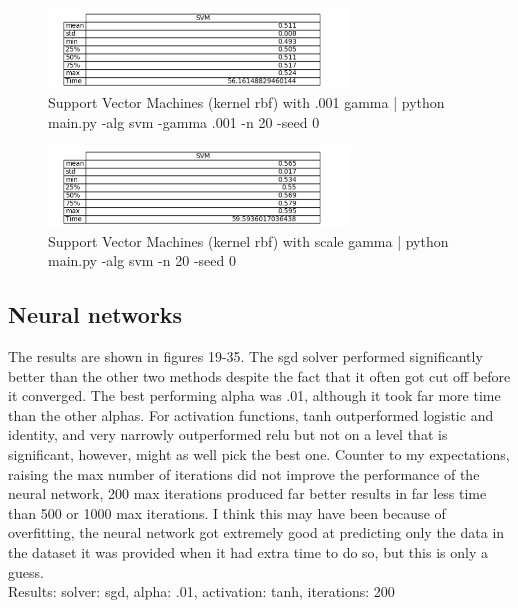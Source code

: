 \documentclass{article}
\begin{document}
\begin{figure}
\begin{center}
\includegraphics[width=8cm]{images/svm_001}
\caption{Support Vector Machines (kernel rbf) with .001 gamma | python main.py -alg svm -gamma .001 -n 20 -seed 0}
\end{center}
\end{figure}
\begin{figure}
\begin{center}
\includegraphics[width=8cm]{images/svm_scale}
\caption{Support Vector Machines (kernel rbf) with scale gamma | python main.py -alg svm -n 20 -seed 0}
\end{center}
\end{figure}

\subsection{Neural networks}

The results are shown in figures 19-35. The sgd solver performed significantly better than the other two methods despite the fact that it often got cut off before it converged. The best performing alpha was .01, although it took far more time than the other alphas. For activation functions, tanh outperformed logistic and identity, and very narrowly outperformed relu but not on a level that is significant, however, might as well pick the best one. Counter to my expectations, raising the max number of iterations did not improve the performance of the neural network, 200 max iterations produced far better results in far less time than 500 or 1000 max iterations. I think this may have been because of overfitting, the neural network got extremely good at predicting only the data in the dataset it was provided when it had extra time to do so, but this is only a guess.\\

Results: solver: sgd, alpha: .01, activation: tanh, iterations: 200
\end{document}
